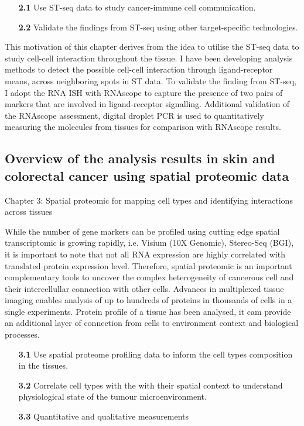 \begin{enumerate}[align=left]
    \item[\textbf{2.1}] Use ST-seq data to study cancer-immune cell communication.
    \item[\textbf{2.2}] Validate the findings from ST-seq using other target-specific technologies.
\end{enumerate}
This motivation of this chapter derives from the idea to utilise the ST-seq data to study cell-cell interaction throughout the tissue. I have been developing analysis methods to detect the possible cell-cell interaction through ligand-receptor means, across neighboring spots in ST data. To validate the finding from ST-seq, I adopt the RNA ISH with RNAscope to capture the presence of two pairs of markers that are involved in ligand-receptor signalling. Additional validation of the RNAscope assessment, digital droplet PCR is used to quantitatively measuring the molecules from tissues for comparison with RNAscope results.      

\subsection{Overview of the analysis results in skin and colorectal cancer using spatial proteomic data}

Chapter 3: Spatial proteomic for mapping cell types and identifying interactions across tissues

While the number of gene markers can be profiled using cutting edge spatial transcriptomic is growing rapidly, i.e. Visium (10X Genomic),  Stereo-Seq (BGI), it is important to note that not all RNA expression are highly correlated with translated protein expression level. Therefore, spatial proteomic is an important complementary tools to uncover the complex heterogeneity of cancerous cell and their intercellullar connection with other cells. Advances in multiplexed tissue imaging enables analysis of up to hundreds of proteins in thousands of cells in a single experiments. Protein profile of a tissue has been analysed, it cam provide an additional layer of connection from cells to environment context and biological processes. 


\begin{enumerate}[align=left]
    \item[\textbf{3.1}] Use spatial proteome profiling data to inform the cell types composition in the tissues.
    \item[\textbf{3.2}] Correlate cell types with the with their spatial context to understand physiological state of the tumour microenvironment.
    \item[\textbf{3.3}] Quantitative and qualitative measurements
\end{enumerate}

